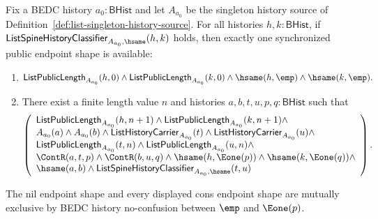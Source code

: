 
\begin{theorem}
\label{thm:list-singleton-source-classified-shape-synchrony}
Fix a BEDC history $a_0:\mathsf{BHist}$ and let $A_{a_0}$ be the singleton
history source of Definition~\ref{def:list-singleton-history-source}. For all
histories $h,k:\mathsf{BHist}$, if
$\mathsf{ListSpineHistoryClassifier}_{A_{a_0},\hsame}(h,k)$ holds, then
exactly one synchronized public endpoint shape is available:
\begin{enumerate}
  \item
  $$
  \mathsf{ListPublicLength}_{A_{a_0}}(h,0)\land
  \mathsf{ListPublicLength}_{A_{a_0}}(k,0)\land
  \hsame(h,\emp)\land \hsame(k,\emp).
  $$
  \item There exist a finite length value $n$ and histories
  $a,b,t,u,p,q:\mathsf{BHist}$ such that
  $$
  \left(
  \begin{array}{l}
  \mathsf{ListPublicLength}_{A_{a_0}}(h,n+1)\land
  \mathsf{ListPublicLength}_{A_{a_0}}(k,n+1)\land\\
  A_{a_0}(a)\land A_{a_0}(b)\land
  \mathsf{ListHistoryCarrier}_{A_{a_0}}(t)\land
  \mathsf{ListHistoryCarrier}_{A_{a_0}}(u)\land\\
  \mathsf{ListPublicLength}_{A_{a_0}}(t,n)\land
  \mathsf{ListPublicLength}_{A_{a_0}}(u,n)\land\\
  \ContR(a,t,p)\land \ContR(b,u,q)\land
  \hsame(h,\Eone(p))\land \hsame(k,\Eone(q))\land\\
  \hsame(a,b)\land
  \mathsf{ListSpineHistoryClassifier}_{A_{a_0},\hsame}(t,u)
  \end{array}
  \right).
  $$
\end{enumerate}
The nil endpoint shape and every displayed cons endpoint shape are mutually
exclusive by BEDC history no-confusion between $\emp$ and $\Eone(p)$.
\end{theorem}
